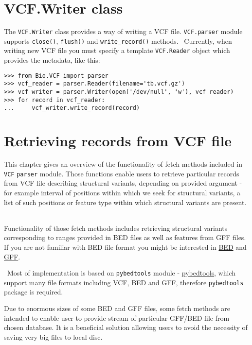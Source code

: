 \section{VCF.Writer class}

\noindent The \verb|VCF.Writer| class provides a way of writing a VCF file.
\verb|VCF.parser| module supports \verb|close()|, \verb|flush()| and \verb|write_record()| methods.
\
\noindent Currently, when writing new VCF file you must specify a template \verb|VCF.Reader| object
which provides the metadata, like this:

\begin{verbatim}
>>> from Bio.VCF import parser
>>> vcf_reader = parser.Reader(filename='tb.vcf.gz')
>>> vcf_writer = parser.Writer(open('/dev/null', 'w'), vcf_reader)
>>> for record in vcf_reader:
...     vcf_writer.write_record(record)
\end{verbatim}




\section{Retrieving records from VCF file}

\noindent This chapter gives an overview of the functionality of fetch methods included in \verb|VCF| \verb|parser| module.
Those functions enable users to retrieve particular records from VCF file describing structural variants,
depending on provided argument - for example interval of positions within which we seek for structural variants, a list
of such positions or feature type within which structural variants are present.
\

\noindent Functionality of those fetch methods includes retrieving structural variants corresponding to ranges
provided in BED files as well as features from GFF files. If you are not familiar with BED file format
you might be interested in \href{http://www.ensembl.org/info/website/upload/bed.html}{BED} and
\href{http://gmod.org/wiki/GFF3}{GFF}.

\
\noindent Most of implementation is based on \verb|pybedtools| module - \href{https://daler.github.io/pybedtools/}{pybedtools},
which support many file formats including VCF, BED and GFF, therefore \verb|pybedtools| package is required.
\

\noindent Due to enormous sizes of some BED and GFF files, some fetch methods are intended to enable user to provide
stream of particular GFF/BED file from chosen database. It is a beneficial solution allowing users to avoid
the necessity of saving very big files to local disc.
\


